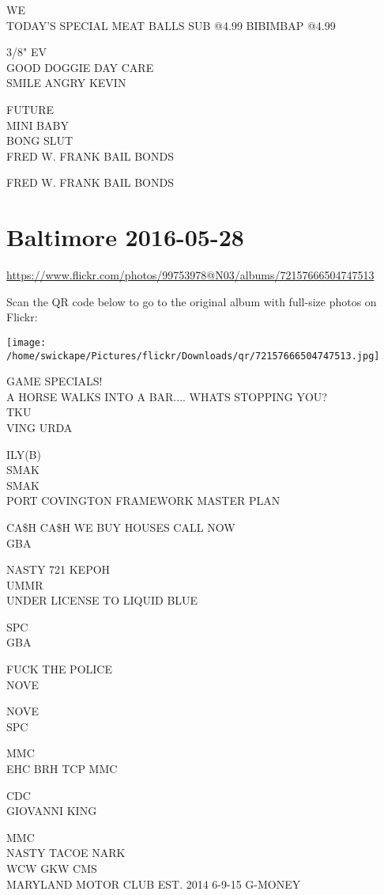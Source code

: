 \documentclass[10pt,letterpaper]{article}
\begin{document}
WE\\
TODAY'S SPECIAL MEAT BALLS SUB @4.99 BIBIMBAP @4.99

3/8" EV\\
GOOD DOGGIE DAY CARE\\
SMILE ANGRY KEVIN

FUTURE\\
MINI BABY\\
BONG SLUT\\
FRED W. FRANK BAIL BONDS

FRED W. FRANK BAIL BONDS
\pagebreak

\section*{Baltimore 2016-05-28}

\url{https://www.flickr.com/photos/99753978@N03/albums/72157666504747513}

Scan the QR code below to go to the original album with full-size photos on Flickr:

\texttt{[image: /home/swickape/Pictures/flickr/Downloads/qr/72157666504747513.jpg]}
\pagebreak

GAME SPECIALS!\\
A HORSE WALKS INTO A BAR.... WHATS STOPPING YOU?\\
TKU\\
VING URDA

ILY(B)\\
SMAK\\
SMAK\\
PORT COVINGTON FRAMEWORK MASTER PLAN

CA\$H CA\$H WE BUY HOUSES CALL NOW\\
GBA

NASTY 721 KEPOH\\
UMMR\\
UNDER LICENSE TO LIQUID BLUE

SPC\\
GBA

FUCK THE POLICE\\
NOVE

NOVE\\
SPC

MMC\\
EHC BRH TCP MMC

CDC\\
GIOVANNI KING

MMC\\
NASTY TACOE NARK\\
WCW GKW CMS\\
MARYLAND MOTOR CLUB EST. 2014 6{-}9{-}15 G{-}MONEY
\end{document}
